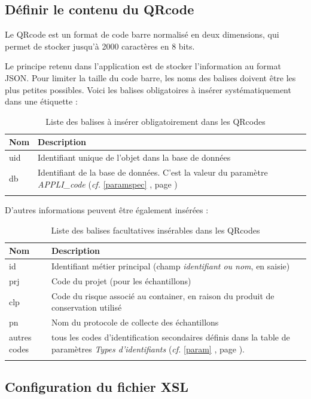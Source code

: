 \subsection{Définir le contenu du QRcode}
Le QRcode est un format de code barre normalisé en deux dimensions, qui permet de stocker jusqu'à 2000 caractères en 8 bits. 

Le principe retenu dans l'application est de stocker l'information au format JSON. Pour limiter la taille du code barre, les noms des balises doivent être les plus petites possibles. Voici les balises obligatoires à insérer systématiquement dans une étiquette :

\begin{longtable}{|p{3cm}|p{12cm}| }
\hline
\textbf{Nom} & \textbf{Description} \\
\hline
\endhead
uid & Identifiant unique de l'objet dans la base de données \\
\hline
db & Identifiant de la base de données. C'est la valeur du paramètre \textit{APPLI\_code} (\textit{cf.} \ref{paramspec} \textit{\nameref{paramspec}}, page \pageref{paramspec}) \\
\hline
\caption{Liste des balises à insérer obligatoirement dans les QRcodes}
\end{longtable}

D'autres informations peuvent être également insérées :
\begin{longtable}{|p{3cm}|p{12cm}| }
\hline
\textbf{Nom} & \textbf{Description} \\
\hline
\endhead
id & Identifiant métier principal (champ \textit{identifiant ou nom}, en saisie) \\
\hline
prj & Code du projet (pour les échantillons) \\
\hline
clp & Code du risque associé au container, en raison du produit de conservation utilisé \\
\hline
pn & Nom du protocole de collecte des échantillons \\
\hline
autres codes & tous les codes d'identification secondaires définis dans la table de paramètres \textit{Types d'identifiants} (\textit{cf.} \ref{param} \textit{\nameref{param}}, page \pageref{param}). \\
\hline

\caption{Liste des balises facultatives insérables dans les QRcodes}
\end{longtable}

\subsection{Configuration du fichier XSL}

